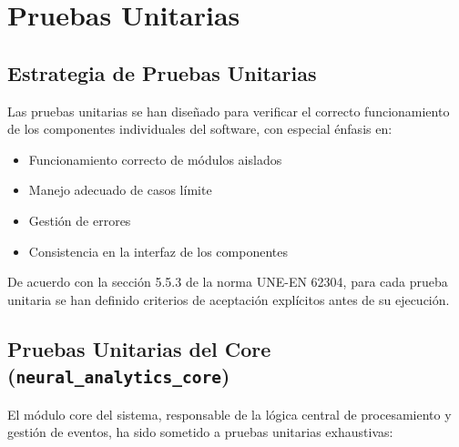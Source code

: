 \section{Pruebas Unitarias}

\subsection{Estrategia de Pruebas Unitarias}

Las pruebas unitarias se han diseñado para verificar el correcto funcionamiento de los componentes individuales del software, con especial énfasis en:

\begin{itemize}
    \item Funcionamiento correcto de módulos aislados
    \item Manejo adecuado de casos límite
    \item Gestión de errores
    \item Consistencia en la interfaz de los componentes
\end{itemize}

De acuerdo con la sección 5.5.3 de la norma UNE-EN 62304, para cada prueba unitaria se han definido criterios de aceptación explícitos antes de su ejecución.

\newpage
\subsection{Pruebas Unitarias del Core (\texttt{neural\_analytics\_core})}

El módulo core del sistema, responsable de la lógica central de procesamiento y gestión de eventos, ha sido sometido a pruebas unitarias exhaustivas:

